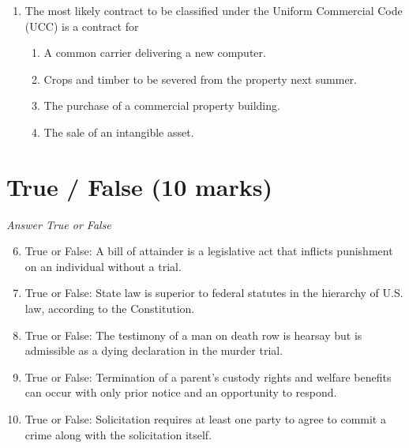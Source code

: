 \documentclass[12pt]{article}
\begin{document}
\begin{enumerate}[label=\arabic*.]
\begin{enumerate}[label=(\alph*)]
    \item Pay just compensation for the property
    \item Terminate the regulation and pay damages that occurred while regulation was in effect
    \item Pay double damages if not addressed in 30 days.
    \item a or b
\end{enumerate}
\item The most likely contract to be classified under the Uniform Commercial Code (UCC) is a contract for
\begin{enumerate}[label=(\alph*)]
    \item A common carrier delivering a new computer.
    \item Crops and timber to be severed from the property next summer.
    \item The purchase of a commercial property building.
    \item The sale of an intangible asset.
\end{enumerate}
\end{enumerate}

\section*{True / False (10 marks)}
\textit{Answer True or False}
\begin{enumerate}[label=\arabic*.]
\setcounter{enumi}{5}
\item True or False: A bill of attainder is a legislative act that inflicts punishment on an individual without a trial.
\item True or False: State law is superior to federal statutes in the hierarchy of U.S. law, according to the Constitution.
\item True or False: The testimony of a man on death row is hearsay but is admissible as a dying declaration in the murder trial.
\item True or False: Termination of a parent's custody rights and welfare benefits can occur with only prior notice and an opportunity to respond.
\item True or False: Solicitation requires at least one party to agree to commit a crime along with the solicitation itself.
\end{enumerate}
\end{document}
